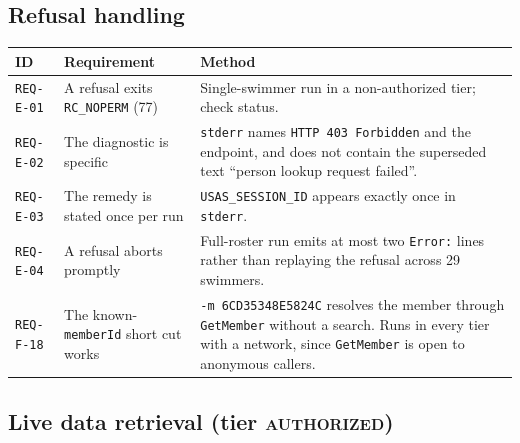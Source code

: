\documentclass[12pt]{article}
\newcommand{\code}[1]{\texttt{#1}}
\newcommand{\req}[1]{\texttt{#1}}
\begin{document}
\subsection{Refusal handling}

\begin{center}
\begin{longtable}{p{2.1cm}p{5.2cm}p{6.2cm}}
  \toprule
  \textbf{ID} & \textbf{Requirement} & \textbf{Method} \\
  \midrule\endhead
  \req{REQ-E-01} & A refusal exits \code{RC\_NOPERM} (77)
    & Single-swimmer run in a non-authorized tier; check status. \\
  \req{REQ-E-02} & The diagnostic is specific
    & \code{stderr} names \code{HTTP 403 Forbidden} and the endpoint,
      and does not contain the superseded text
      ``person lookup request failed''. \\
  \req{REQ-E-03} & The remedy is stated once per run
    & \code{USAS\_SESSION\_ID} appears exactly once in \code{stderr}. \\
  \req{REQ-E-04} & A refusal aborts promptly
    & Full-roster run emits at most two \code{Error:} lines rather
      than replaying the refusal across 29 swimmers. \\
  \req{REQ-F-18} & The known-\code{memberId} short cut works
    & \code{-m 6CD35348E5824C} resolves the member through
      \code{GetMember} without a search.  Runs in every tier with a
      network, since \code{GetMember} is open to anonymous callers. \\
  \bottomrule
\end{longtable}
\end{center}

\subsection{Live data retrieval (tier \textsc{authorized})}
\end{document}
